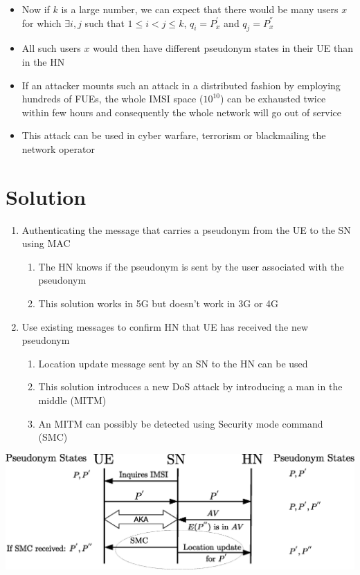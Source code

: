 \documentclass[portrait,a0]{a0poster}
\begin{document}
\begin{multicols}{2}
\begin{itemize}
\item Now if $k$ is a large number, we can expect that there would be many users $x$ for which $\exists i,j$ such that $1 \leq i < j \leq k$, $q_i=P_x^{'}$ and $q_j=P_x^{''}$
\item  All such users $x$ would then have different pseudonym states in their UE than in the HN
\item If an attacker mounts such an attack in a distributed fashion by employing hundreds of FUEs, the whole IMSI space ($10^{10}$) can be exhausted twice within few hours and consequently the whole network will go out of service
\item This attack can be used in cyber warfare, terrorism or blackmailing the network operator
\end{itemize}

\section{Solution}
\begin{enumerate}
\item Authenticating the message that carries a pseudonym from the UE to the SN using MAC 
\begin{enumerate}
\item The HN knows if the pseudonym is sent by the user associated with the pseudonym
\item This solution works in 5G but doesn't work in 3G or 4G  
\end{enumerate}
\item Use existing messages to confirm HN that UE has received the new pseudonym
\begin{enumerate}
\item Location update message sent by an SN to the HN can be used 
\item This solution introduces a new DoS attack by introducing a man in the middle (MITM)
\item An MITM can possibly be detected using Security mode command (SMC) 
\end{enumerate}
\end{enumerate}

\begin{center}
\begin{minipage}[t]{0.9\linewidth} %
\vspace{0cm} %
\includegraphics[width=1\linewidth]{solution.eps}
\hspace{0pt}
\vspace{0cm} %
\end{minipage} 
\end{center}


\end{multicols}
\end{document}
